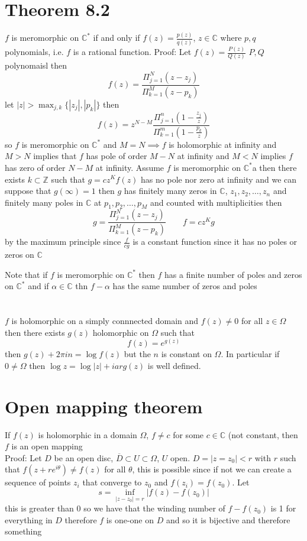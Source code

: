 \documentclass[11pt]{article}
\begin{document}
\section{Theorem 8.2}
$f$ is meromorphic on $ \mathbb{C}^{*}$ if and only if $f(z) = \frac{p(z)}{q(z)}$, $z \in \mathbb{C}$ where $p,q$ polynomials, i.e.  $f$ is a rational function.
Proof: Let $f(z) = \frac{P(z)}{Q(z)}$ $P,Q$ polynomaisl then
 \[
     f(z) = \frac{\Pi_{j=1}^{N}(z-z_j)}{\Pi_{k=1}^{M}(z-p_k)}
\] 
let $|z| > \max_{j,k}\{|z_j|,|p_k|\}$ then  
 \[
     f(z) =  z^{N-M}\frac{\Pi_{j=1}^{n}(1-\frac{z_j}{z})}{\Pi_{k=1}^{m}(1-\frac{p_k}{z})}
\] 
so $f$ is meromorphic on $ \mathbb{C}^{*}$ and $M=N \implies f$ is holomorphic at infinity and  $M > N$ implies
that  $f$ has pole of order $M-N$ at infinity and $M < N$ implies  $f$ has zero of order $N-M$ at infinity.
Assume  $f$ is meromorphic on $ \mathbb{C}^{*}$a then there exists $k \subset \mathbb{Z}$ such that
$g = cz^{K}f(z)$ has no pole nor zero at infinity and we can suppose that $g(\infty) = 1$ then $g$ has finitely many zeros in  $ \mathbb{C}$, $z_1,z_2,\dots,z_n$
and finitely many poles in $ \mathbb{C}$ at $p_1,p_2,\dots,p_M$ and counted with multiplicities then
\[
    g = \frac{\Pi_{j=1}^{N}(z-z_j)}{\Pi_{k=1}^{M}(z-p_k)} \qquad f = cz^{K} g
\] 
by the maximum principle since $ \frac{f}{cg}$ is a constant function since it has no poles or zeros on $ \mathbb{C}$

Note that if  $f$ is meromorphic on $ \mathbb{C}^{*} $ then $f$ has a finite number of poles and zeros on $ \mathbb{C}^{*}$ and if $\alpha \in \mathbb{C}$ thn $f - \alpha$ has the same number of zeros and poles

\section{}
$f$ is holomorphic on a simply connnected domain and $f(z) \ne 0$ for all  $z \in \Omega$ then there exists  $g(z)$ holomorphic on  $\Omega$ such that
 \[
f(z) = e^{g(z)}
\] 
then $g(z) + 2\pi i n = \log f(z)$ but the $n$ is constant on $ \Omega$. In particular if $0 \ne \Omega$ then  $\log z = \log|z| + i arg(z)$ is well defined.

\section{Open mapping theorem}
If $f(z)$ is holomorphic in a domain $\Omega$,  $f \ne c$ for some  $c \in \mathbb{C}$ (not constant, then $f$ is an open mapping\\
Proof: Let $D$ be an open disc, $\overline{ D} \subset U \subset \Omega$, $U$ open.  $D = |z=z_0| < r$  with $r$ such that  $f(z + re^{i\theta}) \ne f(z)$ for all $\theta$, this is possible
since if not we can create a sequence of points $z_i$ that converge to  $z_0$ and $f(z_i) = f(z_0)$.
Let 
\[
    s = \inf_{|z-z_0| = r}|f(z) - f(z_{0})|
\]
this is greater than 0 so we have that the winding number of $f-f(z_0)$ is 1 for everything in $D$ therefore  $f$ is one-one on $D$ and so it is bijective and therefore something
\end{document}
